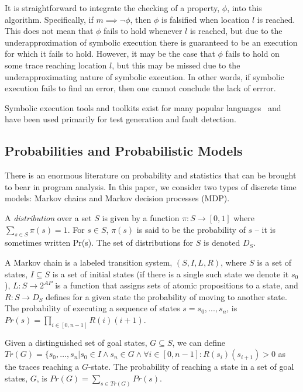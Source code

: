 It is straightforward to integrate the checking of a property,
$\phi$, into this algorithm.  Specifically,
if $m \implies \neg\phi$, then $\phi$ is falsified 
when location $l$ is reached.    This does not mean that $\phi$
fails to hold whenever $l$ is reached, but due to the underapproximation
of symbolic execution there is guaranteed to be an execution for which
it fails to hold.
However, it may be the case that $\phi$ fails to hold
on some trace reaching location $l$, but this may be missed
due to the underapproximating nature of symbolic execution.
In other words, if symbolic execution fails to find an error,
then one cannot conclude the lack of errror.

Symbolic execution tools and toolkits exist for many popular 
languages~\cite{pasareanu2010symbolic,godefroid2005dart,jamrozik2013generating,cadar2008klee}
and have been used primarily for test generation and fault detection.

\subsection{Probabilities and Probabilistic Models}

There is an enormous literature on probability and statistics
that can be brought to bear in program analysis.  
In this paper, we consider two types of discrete time models:
Markov chains and Markov decision processes (MDP).

A \textit{distribution} over a set $S$ is given by a 
function $\pi : S \rightarrow [0,1]$ where
$\sum_{s \in S} \pi(s) = 1$.  For $s \in S$,
$\pi(s)$ is said to be the probability of $s$ -- it is
sometimes written Pr(s).
The set of distributions for $S$ is denoted $D_S$.

A Markov chain is a labeled transition system,
$(S,I,L,R)$, where $S$ is a set of states,
$I \subseteq S$ is a set of initial states (if there is a single
such state we denote it $s_0$), 
$L : S \rightarrow 2^{AP}$ is a function that assigns
sets of atomic propositions to a state, and
$R : S \rightarrow D_S$ defines for a given state
the probability of moving to another state.
The probability of executing a sequence of states $s = s_0, ..., s_n$, 
is $Pr(s) = \prod_{i \in [0,n-1]} R(i)(i+1)$.

Given a distinguished set of goal states, $G \subseteq S$,
we can define $Tr(G) = \{s_0, \ldots, s_n \vert s_0 \in I \wedge
s_n \in G \wedge \forall i \in [0,n-1] : R(s_i)(s_{i+1}) > 0$
as the traces reaching a $G$-state.
The probability of reaching a state in 
a set of goal states, $G$, is $Pr(G) = \sum_{s \in Tr(G)} Pr(s)$.

